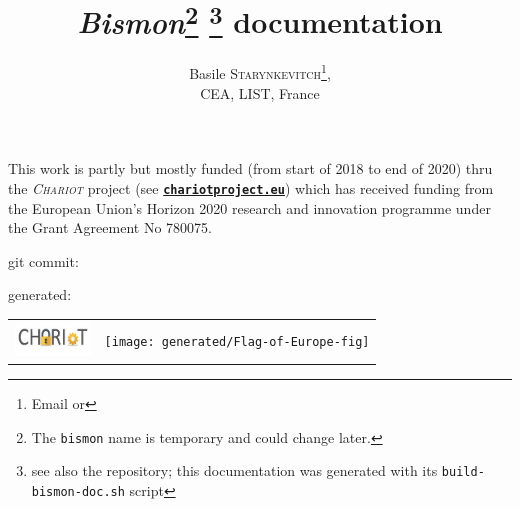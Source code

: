 \documentclass[11pt,a4paper]{article}
\date{\mydocdate}
\title{\emph{Bismon}\thanks{The \texttt{bismon} name is temporary and
    could change later.} \thanks{see also the
    \myurl{github.com/bstarynk/bismon} repository; this documentation was generated with its \texttt{build-bismon-doc.sh} script} documentation}
\author{Basile \textsc{Starynkevitch}\thanks{Email
    \myemail{basile@starynkevitch.net} or
    \myemail{basile.starynkevitch@cea.fr}}, %
  \\ {\small{CEA, LIST,
      France}}}
\newcommand{\myurl}[1]{{\href{http:#1}{\texttt{\textbf{#1}}}}}
\begin{document}
\begin{titlepage}
\maketitle

\begin{relsize}{-2}
This work is partly but mostly funded (from start of 2018 to end of
2020) thru the \textsc{\emph{Chariot}} project (see \myurl{chariotproject.eu})
which has received funding from the European Union’s Horizon 2020
research and innovation programme under the Grant Agreement No
780075.
\end{relsize}

\hspace{2cm}

\begin{center}
{\small git commit: \texttt{\mygitcommit}}

{\small generated: \textit{\mydoctimestamp}}

\hspace{2cm}

\begin{tabular}{cc}
  \includegraphics[width=2cm]{images/CHARIOT-logo} & \texttt{[image: generated/Flag-of-Europe-fig]}
\end{tabular}
\end{center}

\end{titlepage}
\newpage

\tableofcontents

\newpage
\end{document}
